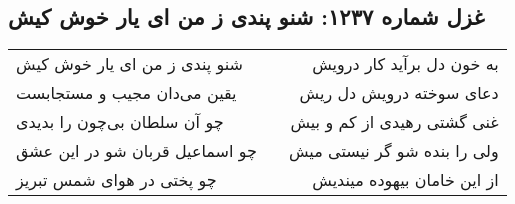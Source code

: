 \begin{center}
\section*{غزل شماره ۱۲۳۷: شنو پندی ز من ای یار خوش کیش}
\label{sec:1237}
\begin{longtable}{l p{0.5cm} r}
شنو پندی ز من ای یار خوش کیش
&&
به خون دل برآید کار درویش
\\
یقین می‌دان مجیب و مستجابست
&&
دعای سوخته درویش دل ریش
\\
چو آن سلطان بی‌چون را بدیدی
&&
غنی گشتی رهیدی از کم و بیش
\\
چو اسماعیل قربان شو در این عشق
&&
ولی را بنده شو گر نیستی میش
\\
چو پختی در هوای شمس تبریز
&&
از این خامان بیهوده میندیش
\\
\end{longtable}
\end{center}

